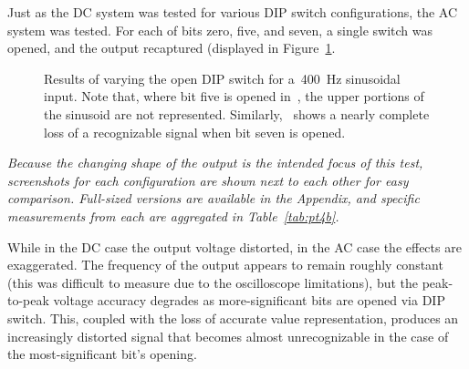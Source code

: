Just as the DC system was tested for various DIP switch configurations, the AC system was tested.  For each of bits zero, five, and seven, a single switch was opened, and the output recaptured (displayed in Figure~\ref{fig:pt4b}.
%
\begin{figure}[H]
	\centering
	\quad
	\quad

	\parbox{.8\textwidth}{
	\caption[\SI{400}{\hertz} Sine Wave --- DIP Switches]{Results of varying the open DIP switch for a~\SI{400}{\hertz} sinusoidal input.  Note that, where bit five is opened in~, the upper portions of the sinusoid are not represented.  Similarly,~ shows a nearly complete loss of a recognizable signal when bit seven is opened.}
	\label{fig:pt4b}}
\end{figure}
%
\emph{Because the changing shape of the output is the intended focus of this test, screenshots for each configuration are shown next to each other for easy comparison.  Full-sized versions are available in the Appendix, and specific measurements from each are aggregated in Table~\ref{tab:pt4b}.}
%
\begin{table}[H]
	\centering
	
	\parbox{.6\textwidth}{
	\caption[\SI{400}{\hertz} Sine Wave --- DIP Switches]{Measured output of a varying state of DIP switch positions for a~\SI{400}{\hertz} sinusoidal input.}
	\label{tab:pt4b}}
\end{table}
%
While in the DC case the output voltage distorted, in the AC case the effects are exaggerated.  The frequency of the output appears to remain roughly constant (this was difficult to measure due to the oscilloscope limitations), but the peak-to-peak voltage accuracy degrades as more-significant bits are opened via DIP switch.  This, coupled with the loss of accurate value representation, produces an increasingly distorted signal that becomes almost unrecognizable in the case of the most-significant bit's opening.

